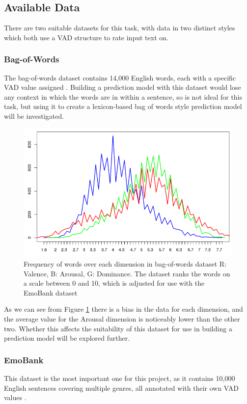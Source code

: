 \subsection{Available Data}
There are two suitable datasets for this task, with data in two distinct styles which both use a VAD structure to rate input text on.

\subsubsection{Bag-of-Words}

The bag-of-words dataset contains 14,000 English words, each with a specific VAD value assigned \cite{wordsData}. Building a prediction model with this dataset would lose any context in which the words are in within a sentence, so is not ideal for this task, but using it to create a lexicon-based bag of words style prediction model will be investigated.

\begin{figure}[h]
\centering
\includegraphics[scale=0.4]{graphs/lexiconDist.png}
\caption{Frequency of words over each dimension in bag-of-words dataset R: Valence, B: Arousal, G: Dominance. The dataset ranks the words on a scale between 0 and 10, which is adjusted for use with the EmoBank dataset}
\label{lexiconGraph}
\end{figure}

As we can see from Figure \ref{lexiconGraph} there is a bias in the data for each dimension, and the average value for the Arousal dimension is noticeably lower than the other two. Whether this affects the suitability of this dataset for use in building a prediction model will be explored further.

\subsubsection{EmoBank}
This dataset is the most important one for this project, as it contains 10,000 English sentences covering multiple genres, all annotated with their own VAD values \cite{emoBank}.

